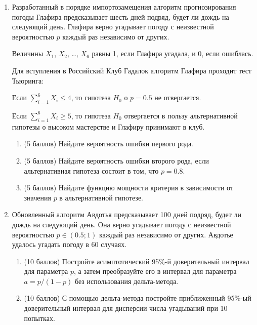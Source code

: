 \documentclass[12pt]{article} %
\begin{document}
\begin{enumerate}
\item Разработанный в порядке импортозамещения алгоритм прогнозирования погоды Глафира предсказывает шесть дней подряд, будет ли дождь на следующий день. Глафира верно угадывает погоду с неизвестной вероятностью $p$ каждый раз независимо от других.

Величины $X_1$, $X_2$, \ldots, $X_6$ равны 1, если Глафира угадала, и 0, если ошиблась. 

Для вступления в Российский Клуб Гадалок алгоритм Глафира проходит тест Тьюринга:

Если $\sum_{i=1}^6 X_i \leq 4$, то гипотеза $H_0$ о $p=0.5$ не отвергается. 

Если $\sum_{i=1}^6 X_i \geq 5$, то гипотеза $H_0$ отвергается в пользу альтернативной гипотезы о высоком мастерстве и Глафиру принимают в клуб.

\begin{enumerate}
    \item (5 баллов) Найдите вероятность ошибки первого рода.
    \item (5 баллов) Найдите вероятность ошибки второго рода,
    если альтернативная гипотеза состоит в том, что $p=0.8$.
    \item (5 баллов) Найдите функцию мощности критерия в зависимости от значения $p$ в альтернативной гипотезе. 
\end{enumerate}

\item Обновленный алгоритм Авдотья предсказывает 100 дней подряд, будет ли дождь на следующий день. Она верно угадывает погоду с неизвестной вероятностью $p \in (0.5; 1)$ каждый раз независимо от других. 
Авдотье удалось угадать погоду в 60 случаях. 


\begin{enumerate}
\item (10 баллов) Постройте асимптотический 95\%-й доверительный интервал для параметра $p$, а затем преобразуйте его в интервал для параметра $a= p/(1-p)$ без использования дельта-метода.
\item (10 баллов) С помощью дельта-метода постройте приближенный 95\%-ый доверительный интервал для дисперсии числа угадываний при 10 попытках.
\end{enumerate}




\end{enumerate}
\end{document}
